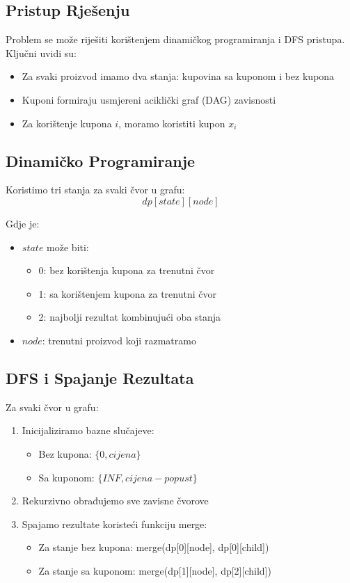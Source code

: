 \subsection{Pristup Rješenju}
Problem se može riješiti korištenjem dinamičkog programiranja i DFS pristupa. Ključni uvidi su:
\begin{itemize}
    \item Za svaki proizvod imamo dva stanja: kupovina sa kuponom i bez kupona
    \item Kuponi formiraju usmjereni aciklički graf (DAG) zavisnosti
    \item Za korištenje kupona $i$, moramo koristiti kupon $x_i$
\end{itemize}

\subsection{Dinamičko Programiranje}
Koristimo tri stanja za svaki čvor u grafu:
\begin{equation*}
dp[state][node]
\end{equation*}

Gdje je:
\begin{itemize}
    \item $state$ može biti:
        \begin{itemize}
            \item 0: bez korištenja kupona za trenutni čvor
            \item 1: sa korištenjem kupona za trenutni čvor
            \item 2: najbolji rezultat kombinujući oba stanja
        \end{itemize}
    \item $node$: trenutni proizvod koji razmatramo
\end{itemize}

\subsection{DFS i Spajanje Rezultata}
Za svaki čvor u grafu:
\begin{enumerate}
    \item Inicijaliziramo bazne slučajeve:
        \begin{itemize}
            \item Bez kupona: $\{0, cijena\}$
            \item Sa kuponom: $\{INF, cijena - popust\}$
        \end{itemize}
    \item Rekurzivno obrađujemo sve zavisne čvorove
    \item Spajamo rezultate koristeći funkciju merge:
        \begin{itemize}
            \item Za stanje bez kupona: merge(dp[0][node], dp[0][child])
            \item Za stanje sa kuponom: merge(dp[1][node], dp[2][child])
        \end{itemize}
\end{enumerate}

